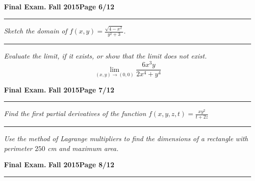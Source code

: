 \documentclass[12pt]{article}
\begin{document}
\newpage

\hfill{\large\bf Final Exam.}\hfill{\large\bf
  Fall 2015}\hfill{\large\bf Page 6/12}\hrule

\bigskip
{\problem[5 pts] \em  Sketch the domain of $f(x,y)=\displaystyle{\frac{\sqrt{4-x^2}}{y^2+3}}$.}
\vspace{11.5cm}
\hrule
{\problem[5 pts] \em Evaluate the limit, if it exists, or show that the limit does not exist.}
\begin{equation*}
\lim_{(x,y) \to (0,0)} \frac{ 6x^3 y}{ 2x^4 + y^4}
\end{equation*}
\vspace{6.5cm}
\begin{flushright}
\end{flushright}
\newpage

\hfill{\large\bf Final Exam.}\hfill{\large\bf
  Fall 2015}\hfill{\large\bf Page 7/12}\hrule

\bigskip
{\problem[5 pts] \em Find the first partial derivatives of the function $f(x,y,z,t) = \frac{xy^2}{t+2z}$}

\vspace{9.5cm}
\hrule
{\problem[5 pts] \em Use the method of Lagrange multipliers to find the
dimensions of a rectangle with perimeter $250$ cm and maximum area.}
\vspace{7.5cm}
\begin{flushright}
\end{flushright}
\newpage

\hfill{\large\bf Final Exam.}\hfill{\large\bf
  Fall 2015}\hfill{\large\bf Page 8/12}\hrule
\end{document}
